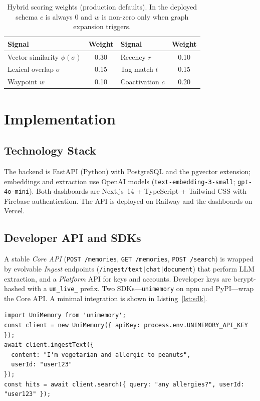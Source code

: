 \documentclass[conference]{IEEEtran}
\begin{document}
\begin{table}[t]
\caption{Hybrid scoring weights (production defaults). In the deployed schema
$c$ is always 0 and $w$ is non-zero only when graph expansion triggers.}
\label{tab:weights}
\centering
\footnotesize
\begin{tabular}{@{}lc|lc@{}}
\toprule
Signal & Weight & Signal & Weight \\
\midrule
Vector similarity $\phi(\sigma)$ & 0.30 & Recency $r$ & 0.10 \\
Lexical overlap $o$ & 0.15 & Tag match $t$ & 0.15 \\
Waypoint $w$ & 0.10 & Coactivation $c$ & 0.20 \\
\bottomrule
\end{tabular}
\end{table}

\section{Implementation}\label{sec:impl}
\subsection{Technology Stack}
The backend is FastAPI (Python) with PostgreSQL and the pgvector extension;
embeddings and extraction use OpenAI models (\texttt{text-embedding-3-small};
\texttt{gpt-4o-mini}). Both dashboards are Next.js~14 + TypeScript + Tailwind
CSS with Firebase authentication. The API is deployed on Railway and the
dashboards on Vercel.

\subsection{Developer API and SDKs}
A stable \emph{Core API} (\texttt{POST /memories}, \texttt{GET /memories},
\texttt{POST /search}) is wrapped by evolvable \emph{Ingest} endpoints
(\texttt{/ingest/text|chat|document}) that perform LLM extraction, and a
\emph{Platform} API for keys and accounts. Developer keys are bcrypt-hashed with
a \texttt{um\_live\_} prefix. Two SDKs---\texttt{unimemory} on npm and
PyPI---wrap the Core API. A minimal integration is shown in
Listing~\ref{lst:sdk}.

\begin{lstlisting}[caption={JavaScript SDK integration.},label={lst:sdk}]
import UniMemory from 'unimemory';
const client = new UniMemory({ apiKey: process.env.UNIMEMORY_API_KEY });
await client.ingestText({
  content: "I'm vegetarian and allergic to peanuts",
  userId: "user123"
});
const hits = await client.search({ query: "any allergies?", userId: "user123" });
\end{lstlisting}
\end{document}
